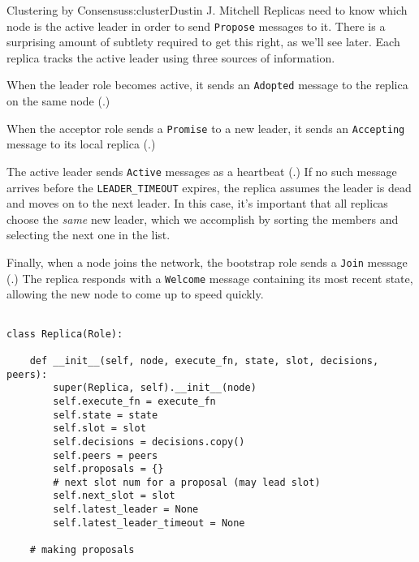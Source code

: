 \begin{aosachapter}{Clustering by Consensus}{s:cluster}{Dustin J. Mitchell}
Replicas need to know which node is the active leader in order to send
\texttt{Propose} messages to it. There is a surprising amount of
subtlety required to get this right, as we'll see later. Each replica
tracks the active leader using three sources of information.

When the leader role becomes active, it sends an \texttt{Adopted}
message to the replica on the same node
(.)


When the acceptor role sends a \texttt{Promise} to a new leader, it
sends an \texttt{Accepting} message to its local replica
(.)


The active leader sends \texttt{Active} messages as a heartbeat
(.) If no such message arrives before
the \texttt{LEADER\_TIMEOUT} expires, the replica assumes the leader is
dead and moves on to the next leader. In this case, it's important that
all replicas choose the \emph{same} new leader, which we accomplish by
sorting the members and selecting the next one in the list.


Finally, when a node joins the network, the bootstrap role sends a
\texttt{Join} message (.) The replica
responds with a \texttt{Welcome} message containing its most recent
state, allowing the new node to come up to speed quickly.


\begin{verbatim}

class Replica(Role):

    def __init__(self, node, execute_fn, state, slot, decisions, peers):
        super(Replica, self).__init__(node)
        self.execute_fn = execute_fn
        self.state = state
        self.slot = slot
        self.decisions = decisions.copy()
        self.peers = peers
        self.proposals = {}
        # next slot num for a proposal (may lead slot)
        self.next_slot = slot
        self.latest_leader = None
        self.latest_leader_timeout = None

    # making proposals


\end{verbatim}
\end{aosachapter}
